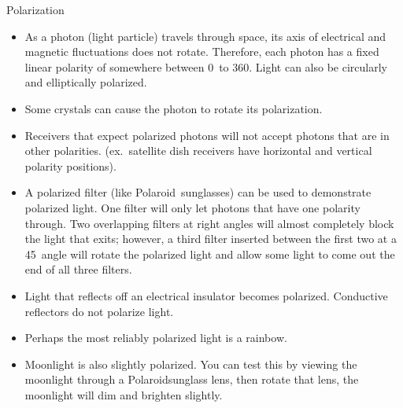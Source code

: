 {\Large Polarization}
\begin{itemize}

\item As a photon (light particle) travels through space, its axis of electrical and magnetic fluctuations does not rotate. Therefore, each photon has a fixed linear polarity of somewhere between 0\degree\ to 360\degree. Light can also be circularly and elliptically polarized.

\item Some crystals can cause the photon to rotate its polarization.

\item Receivers that expect polarized photons will not accept photons that are in other polarities. (ex.\ satellite dish receivers have horizontal and vertical polarity positions).

\item A polarized filter (like Polaroid\texttrademark\  sunglasses) can be used to demonstrate polarized light. One filter will only let photons that have one polarity through. Two overlapping filters at right angles will almost completely block the light that exits; however, a third filter inserted between the first two at a 45\degree\ angle will rotate the polarized light and allow some light to come out the end of all three filters.

\item Light that reflects off an electrical insulator becomes polarized. Conductive reflectors do not polarize light.

\item Perhaps the most reliably polarized light is a rainbow.

\item Moonlight is also slightly polarized. You can test this by viewing the moonlight through a Polaroid\texttrademark sunglass lens, then rotate that lens, the moonlight will dim and brighten slightly.

\end{itemize}


